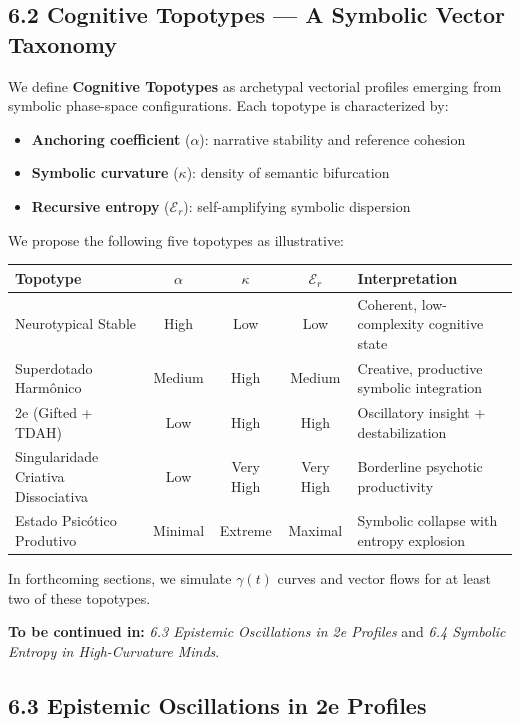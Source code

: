 \subsection*{6.2 Cognitive Topotypes — A Symbolic Vector Taxonomy}

We define \textbf{Cognitive Topotypes} as archetypal vectorial profiles emerging from symbolic phase-space configurations. Each topotype is characterized by:
\begin{itemize}[noitemsep]
    \item \textbf{Anchoring coefficient} ($\alpha$): narrative stability and reference cohesion
    \item \textbf{Symbolic curvature} ($\kappa$): density of semantic bifurcation
    \item \textbf{Recursive entropy} ($\mathcal{E}_r$): self-amplifying symbolic dispersion
\end{itemize}

We propose the following five topotypes as illustrative:

\begin{center}
\begin{tabular}{|l|c|c|c|l|}
\hline
\textbf{Topotype} & $\alpha$ & $\kappa$ & $\mathcal{E}_r$ & \textbf{Interpretation} \\
\hline
Neurotypical Stable & High & Low & Low & Coherent, low-complexity cognitive state \\
Superdotado Harmônico & Medium & High & Medium & Creative, productive symbolic integration \\
2e (Gifted + TDAH) & Low & High & High & Oscillatory insight + destabilization \\
Singularidade Criativa Dissociativa & Low & Very High & Very High & Borderline psychotic productivity \\
Estado Psicótico Produtivo & Minimal & Extreme & Maximal & Symbolic collapse with entropy explosion \\
\hline
\end{tabular}
\end{center}

In forthcoming sections, we simulate $\gamma(t)$ curves and vector flows for at least two of these topotypes.

\bigskip
\noindent
\textbf{To be continued in:} \textit{6.3 Epistemic Oscillations in 2e Profiles} and \textit{6.4 Symbolic Entropy in High-Curvature Minds}.


\subsection*{6.3 Epistemic Oscillations in 2e Profiles}

